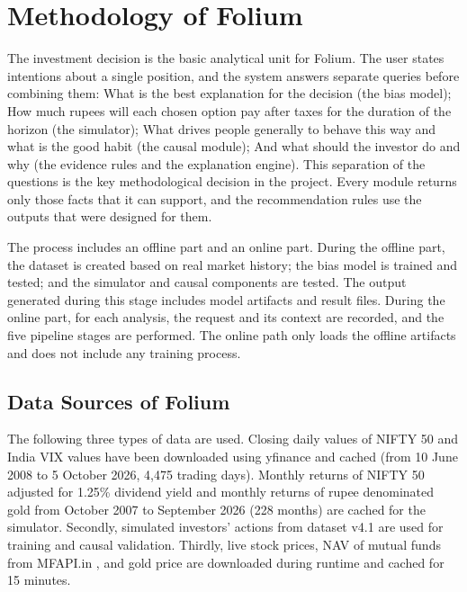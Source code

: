 \chapter{Methodology of Folium}
The investment decision is the basic analytical unit for Folium. The user states intentions about a single position, and the system answers separate queries before combining them: What is the best explanation for the decision (the bias model); How much rupees will each chosen option pay after taxes for the duration of the horizon (the simulator); What drives people generally to behave this way and what is the good habit (the causal module); And what should the investor do and why (the evidence rules and the explanation engine). This separation of the questions is the key methodological decision in the project. Every module returns only those facts that it can support, and the recommendation rules use the outputs that were designed for them.

The process includes an offline part and an online part. During the offline part, the dataset is created based on real market history; the bias model is trained and tested; and the simulator and causal components are tested. The output generated during this stage includes model artifacts and result files. During the online part, for each analysis, the request and its context are recorded, and the five pipeline stages are performed. The online path only loads the offline artifacts and does not include any training process.

\section{Data Sources of Folium}
The following three types of data are used. Closing daily values of NIFTY 50 and India VIX values \cite{b54} have been downloaded using yfinance \cite{b52} and cached (from 10 June 2008 to 5 October 2026, 4,475 trading days). Monthly returns of NIFTY 50 adjusted for 1.25\% dividend yield and monthly returns of rupee denominated gold from October 2007 to September 2026 (228 months) are cached for the simulator. Secondly, simulated investors' actions from dataset v4.1 are used for training and causal validation. Thirdly, live stock prices, NAV of mutual funds from MFAPI.in \cite{b53}, and gold price are downloaded during runtime and cached for 15 minutes.

